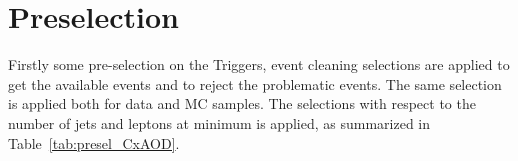 \section{Preselection}
Firstly some pre-selection on the Triggers, event cleaning selections are applied to get the available events and to reject the problematic events. The same selection is applied both for data and MC samples.
The selections with respect to the number of jets and leptons at minimum is applied, as summarized in Table~\ref{tab:presel_CxAOD}.
\begin{table}[H]
\begin{center}
\end{center}
\caption{List of the pre-selections applied.
} \label{tab:presel_CxAOD}
\end{table}

